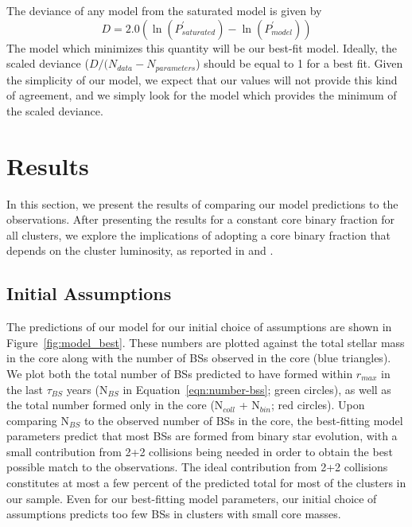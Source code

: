 The deviance of any model from the saturated model is given by
\begin{equation}
\label{eqn:deviance}
D = 2.0(\ln(P^{\prime}_{saturated}) - \ln(P^{\prime}_{model}))
\end{equation}
The model which minimizes this quantity will be our best-fit
model.  Ideally, the scaled deviance ($D/(N_{data}-N_{parameters}$)
should be equal to 1 for a best fit.  Given the simplicity of our
model, we expect that our values will not provide this kind of
agreement, and we simply look for the model which provides the minimum
of the scaled deviance.

\section{Results} \label{results5}

In this section, we present the results of comparing our model
predictions to the observations.  After presenting the results for 
a constant core binary fraction for all clusters, we explore the
implications of adopting a core binary fraction that depends on the
cluster luminosity, as reported in \citet{sollima07} and
\citet{milone08}. 

\subsection{Initial Assumptions} \label{initial}

The predictions of our model for our initial choice of assumptions are
shown in Figure~\ref{fig:model_best}.  These numbers are plotted
against the total stellar mass in the core along with the 
number of BSs observed in the core (blue triangles).  We plot both the
total number of BSs predicted to have formed within $r_{max}$ in the
last $\tau_{BS}$ years (N$_{BS}$ in Equation~\ref{eqn:number-bss};
green circles), as well as the total number formed only in the core
(N$_{coll}$ + N$_{bin}$; red circles).  Upon comparing N$_{BS}$ to the
observed number of BSs in the core, 
the best-fitting model parameters predict that most BSs are formed
from binary star evolution, with a small contribution from 2+2
collisions being needed in order to obtain the best possible match to
the observations.  The ideal contribution from 2+2 collisions
constitutes at 
most a few percent of the predicted total for most of the clusters in
our sample.  Even for our best-fitting model
parameters, our initial choice of assumptions predicts too few BSs in
clusters with small core masses. 


